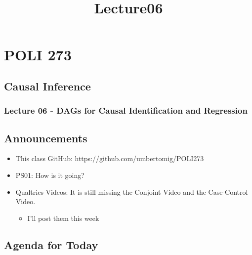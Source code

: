 \documentclass[11pt]{article}
\title{Lecture06}
\providecommand{\tightlist}{%
      \setlength{\itemsep}{0pt}\setlength{\parskip}{0pt}}
\begin{document}
    
    \maketitle
    
    

    
    \hypertarget{poli-273}{%
\section{POLI 273}\label{poli-273}}

\hypertarget{causal-inference}{%
\subsection{Causal Inference}\label{causal-inference}}

\hypertarget{lecture-06---dags-for-causal-identification-and-regression}{%
\subsubsection{Lecture 06 - DAGs for Causal Identification and
Regression}\label{lecture-06---dags-for-causal-identification-and-regression}}

    \hypertarget{announcements}{%
\subsection{Announcements}\label{announcements}}

\begin{itemize}
\item
  This class GitHub: https://github.com/umbertomig/POLI273
\item
  PS01: How is it going?
\item
  Qualtrics Videos: It is still missing the Conjoint Video and the
  Case-Control Video.

  \begin{itemize}
  \tightlist
  \item
    I'll post them this week
  \end{itemize}
\end{itemize}

    \hypertarget{agenda-for-today}{%
\subsection{Agenda for Today}\label{agenda-for-today}}
\end{document}
